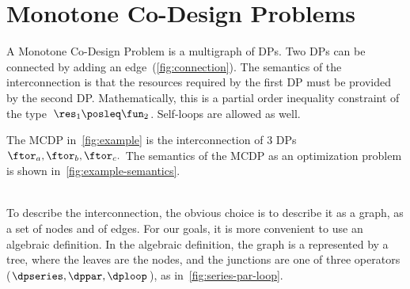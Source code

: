

\section{Monotone Co-Design Problems \label{sec:Monotone-Co-Design-Problems}}

A Monotone Co-Design Problem is a multigraph of DPs. Two DPs can be
connected by adding an edge~(\cref{fig:connection}). The semantics
of the interconnection is that the resources required by the first
DP must be provided by the second DP. Mathematically, this is a partial
order inequality constraint of the type~$\res_{1}\posleq\fun_{2}$.
Self-loops are allowed as well.

\begin{example}
The MCDP in~\cref{fig:example} is the interconnection of 3
DPs $\ftor_{a},\ftor_{b},\ftor_{c}.$ The semantics of the MCDP as
an optimization problem is shown in~\cref{fig:example-semantics}.\\
\\
\end{example}
To describe the interconnection, the obvious choice is to describe
it as a graph, as a set of nodes and of edges. For our goals, it is
more convenient to use an algebraic definition. In the algebraic definition,
the graph is a represented by a tree, where the leaves are the nodes,
and the junctions are one of three operators ($\dpseries,\dppar,\dploop$),
as in~\cref{fig:series-par-loop}.

